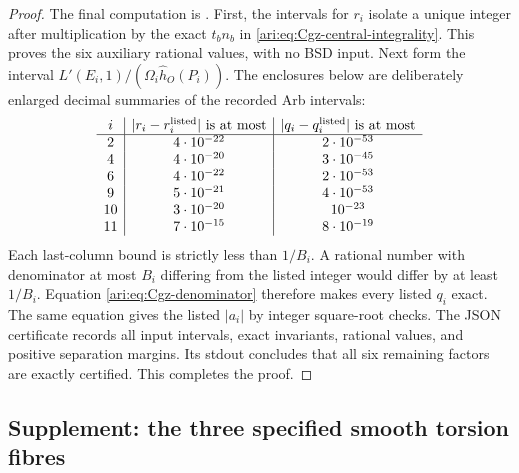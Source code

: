 \begin{proof}
The final computation is
. First, the intervals for
$r_i$ isolate a unique integer after multiplication by the exact
$t_bn_b$ in \eqref{ari:eq:Cgz-central-integrality}. This proves the
six auxiliary rational values, with no BSD input. Next form the
interval $L'(E_i,1)/(\Omega_i\widehat h_O(P_i))$. The enclosures
below are deliberately enlarged decimal summaries of the recorded
Arb intervals:
\[
\begin{array}{c|c|c}
 i&|r_i-r_i^{\rm listed}|\text{ is at most}
   &|q_i-q_i^{\rm listed}|\text{ is at most}\\\hline
 2&4\cdot10^{-22}&2\cdot10^{-53}\\
 4&4\cdot10^{-20}&3\cdot10^{-45}\\
 6&4\cdot10^{-22}&2\cdot10^{-53}\\
 9&5\cdot10^{-21}&4\cdot10^{-53}\\
 10&3\cdot10^{-20}&10^{-23}\\
 11&7\cdot10^{-15}&8\cdot10^{-19}
\end{array}
\]
Each last-column bound is strictly less than $1/B_i$. A rational
number with denominator at most $B_i$ differing from the listed
integer would differ by at least $1/B_i$. Equation
\eqref{ari:eq:Cgz-denominator} therefore makes every listed $q_i$
exact. The same equation gives the listed $|a_i|$ by integer
square-root checks. The JSON certificate records all input
intervals, exact invariants, rational values, and positive separation
margins. Its stdout concludes that all six remaining factors are
exactly certified. This completes the proof.
\end{proof}


\subsection{Supplement: the three specified smooth torsion fibres}

